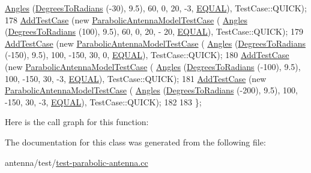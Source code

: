 \begin{DoxyCode}
      \hyperlink{structns3_1_1Angles}{Angles} (\hyperlink{namespacens3_aa3494662745a9a1656f3e6047a6a4062}{DegreesToRadians}  (-30),  9.5),        60,           0,       20,            
      -3,     \hyperlink{test-parabolic-antenna_8cc_a893d085fdc93f5aae203e0153fb83d32a59a84258a4cb9025b567ee5139455029}{EQUAL}), TestCase::QUICK);
178   \hyperlink{classns3_1_1TestCase_a3718088e3eefd5d6454569d2e0ddd835}{AddTestCase} (\textcolor{keyword}{new} \hyperlink{classParabolicAntennaModelTestCase}{ParabolicAntennaModelTestCase} (
      \hyperlink{structns3_1_1Angles}{Angles} (\hyperlink{namespacens3_aa3494662745a9a1656f3e6047a6a4062}{DegreesToRadians}  (100),  9.5),        60,           0,       20,           -
      20,     \hyperlink{test-parabolic-antenna_8cc_a893d085fdc93f5aae203e0153fb83d32a59a84258a4cb9025b567ee5139455029}{EQUAL}), TestCase::QUICK);
179   \hyperlink{classns3_1_1TestCase_a3718088e3eefd5d6454569d2e0ddd835}{AddTestCase} (\textcolor{keyword}{new} \hyperlink{classParabolicAntennaModelTestCase}{ParabolicAntennaModelTestCase} (
      \hyperlink{structns3_1_1Angles}{Angles} (\hyperlink{namespacens3_aa3494662745a9a1656f3e6047a6a4062}{DegreesToRadians} (-150),  9.5),       100,        -150,       30,            
       0,     \hyperlink{test-parabolic-antenna_8cc_a893d085fdc93f5aae203e0153fb83d32a59a84258a4cb9025b567ee5139455029}{EQUAL}), TestCase::QUICK);
180   \hyperlink{classns3_1_1TestCase_a3718088e3eefd5d6454569d2e0ddd835}{AddTestCase} (\textcolor{keyword}{new} \hyperlink{classParabolicAntennaModelTestCase}{ParabolicAntennaModelTestCase} (
      \hyperlink{structns3_1_1Angles}{Angles} (\hyperlink{namespacens3_aa3494662745a9a1656f3e6047a6a4062}{DegreesToRadians} (-100),  9.5),       100,        -150,       30,            
      -3,     \hyperlink{test-parabolic-antenna_8cc_a893d085fdc93f5aae203e0153fb83d32a59a84258a4cb9025b567ee5139455029}{EQUAL}), TestCase::QUICK);
181   \hyperlink{classns3_1_1TestCase_a3718088e3eefd5d6454569d2e0ddd835}{AddTestCase} (\textcolor{keyword}{new} \hyperlink{classParabolicAntennaModelTestCase}{ParabolicAntennaModelTestCase} (
      \hyperlink{structns3_1_1Angles}{Angles} (\hyperlink{namespacens3_aa3494662745a9a1656f3e6047a6a4062}{DegreesToRadians} (-200),  9.5),       100,        -150,       30,            
      -3,     \hyperlink{test-parabolic-antenna_8cc_a893d085fdc93f5aae203e0153fb83d32a59a84258a4cb9025b567ee5139455029}{EQUAL}), TestCase::QUICK);
182 
183 \};
\end{DoxyCode}


Here is the call graph for this function\+:




The documentation for this class was generated from the following file\+:\begin{DoxyCompactItemize}
\item 
antenna/test/\hyperlink{test-parabolic-antenna_8cc}{test-\/parabolic-\/antenna.\+cc}\end{DoxyCompactItemize}
